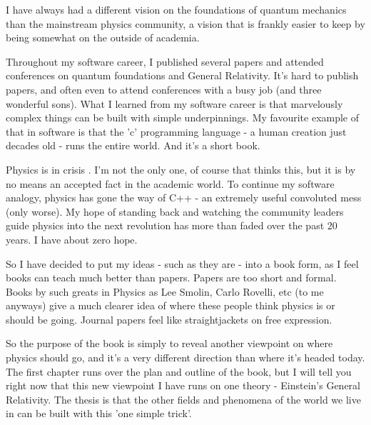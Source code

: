 \documentclass[../rzero]{subfiles}
\begin{document}
I have always had a different vision on the foundations of quantum mechanics than the mainstream physics community, a vision that is frankly easier to keep by being somewhat on the outside of academia.  

Throughout my software career, I published several papers and attended conferences on quantum foundations and General Relativity. It's hard to publish papers, and often even to attend conferences with a busy job (and three wonderful sons). What I learned from my software career is that marvelously complex things can be built with simple underpinnings. My favourite example of that in software is that the 'c' programming language - a human creation just decades old - runs the entire world. And it's a short book\cite{kernighan2002c}. 

Physics is in crisis \cite{hossenfelder2018lost}. I'm not the only one, of course that thinks this, but it is by no means an accepted fact in the academic world. To continue my software analogy, physics has gone the way of C++ - an extremely useful convoluted mess (only worse). My hope of standing back and watching the community leaders guide physics into the next revolution has more than faded over the past 20 years. I have about zero hope.   

So I have decided to put my ideas - such as they are - into a book form, as I feel books can teach much better than papers. Papers are too short and formal. Books by such greats in Physics as Lee Smolin, Carlo Rovelli, etc (to me anyways) give a much clearer idea of where these people think physics is or should be going. Journal papers feel like straightjackets on free expression. 

So the purpose of the book is simply to reveal another viewpoint on where physics should go, and it's a very different direction than where it's headed today. The first chapter runs over the plan and outline of the book, but I will tell you right now that this new viewpoint I have runs on one theory - Einstein's General Relativity. The thesis is that the other fields and phenomena of the world we live in can be built with this 'one simple trick'. 
\end{document}
